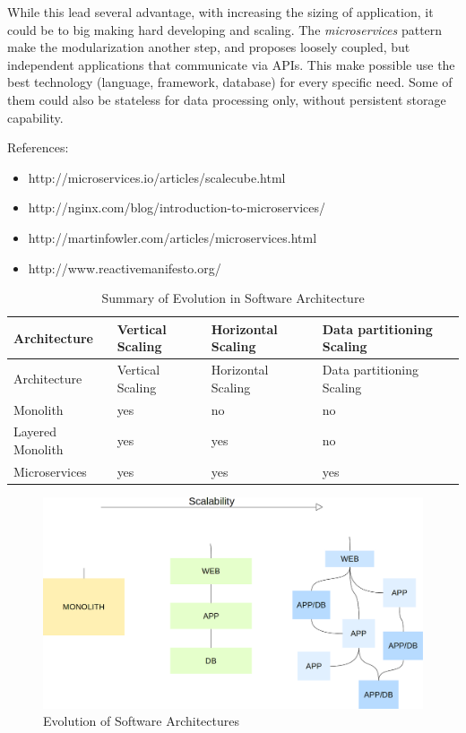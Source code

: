 While this lead several advantage, with increasing the sizing of
application, it could be to big making hard developing and scaling. The
\textit{microservices} pattern make the modularization another step, and
proposes loosely coupled, but independent applications that communicate
via APIs. This make possible use the best technology (language,
framework, database) for every specific need. Some of them could also be stateless for data processing only, without persistent storage capability.

References:
\begin{itemize}

\item http://microservices.io/articles/scalecube.html
\item http://nginx.com/blog/introduction-to-microservices/
\item http://martinfowler.com/articles/microservices.html
\item http://www.reactivemanifesto.org/
\end{itemize}

\begin{longtable}[c]{@{}llll@{}}
\caption{Summary of Evolution in Software Architecture}\tabularnewline
\toprule
Architecture & Vertical Scaling & Horizontal Scaling & Data partitioning
Scaling\tabularnewline
\midrule
\endfirsthead
\toprule
Architecture & Vertical Scaling & Horizontal Scaling & Data partitioning
Scaling\tabularnewline
\midrule
\endhead
Monolith & yes & no & no\tabularnewline
Layered Monolith & yes & yes & no\tabularnewline
Microservices & yes & yes & yes\tabularnewline
\bottomrule
\end{longtable}

\begin{figure}[htbp]
\centering
\includegraphics{media/ch2-microservices.png}
\caption{Evolution of Software Architectures}
\end{figure}

